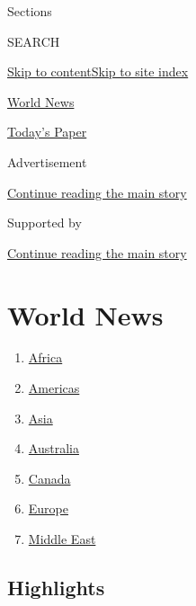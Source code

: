 Sections

SEARCH

\protect\hyperlink{site-content}{Skip to
content}\protect\hyperlink{site-index}{Skip to site index}

\href{https://www.nytimes.com/section/world}{World News}

\href{https://myaccount.nytimes.com/auth/login?response_type=cookie\&client_id=vi}{}

\href{https://www.nytimes.com/section/todayspaper}{Today's Paper}

Advertisement

\protect\hyperlink{after-top}{Continue reading the main story}

Supported by

\protect\hyperlink{after-sponsor}{Continue reading the main story}

\hypertarget{world-news}{%
\section{World News}\label{world-news}}

\begin{enumerate}
\def\labelenumi{\arabic{enumi}.}
\tightlist
\item
  \href{/section/world/africa}{Africa}
\item
  \href{/section/world/americas}{Americas}
\item
  \href{/section/world/asia}{Asia}
\item
  \href{/section/world/australia}{Australia}
\item
  \href{/section/world/canada}{Canada}
\item
  \href{/section/world/europe}{Europe}
\item
  \href{/section/world/middleeast}{Middle East}
\end{enumerate}

\hypertarget{highlights}{%
\subsection{Highlights}\label{highlights}}

